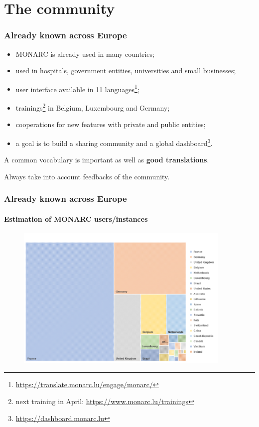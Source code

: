 \documentclass[]{beamer}
\begin{document}
\section{The community}
\begin{frame}
    \frametitle{Already known across Europe}
    \begin{center}
        \begin{itemize}
            \item MONARC is already used in many countries;
            \item used in hospitals, government entities, universities and small businesses;
            \item user interface available in 11 languages\footnote{\url{https://translate.monarc.lu/engage/monarc/}};
            \item trainings\footnote{next training in April: \url{https://www.monarc.lu/trainings}} in Belgium, Luxembourg and Germany;
            \item cooperations for new features with private and public entities;
            \item a goal is to build a sharing community and a global dashboard\footnote{\url{https://dashboard.monarc.lu}}.
        \end{itemize}
    \end{center}
    \bigskip
    A common vocabulary is important as well as \textbf{good translations}.

    \bigskip
    Always take into account feedbacks of the community.
\end{frame}


\begin{frame}
    \frametitle{Already known across Europe}
    \framesubtitle{Estimation of MONARC users/instances}
    \begin{figure}
        \includegraphics[width=10.3cm]{./pictures/monarc-countries-estimation.png}
    \end{figure}
\end{frame}
\end{document}
